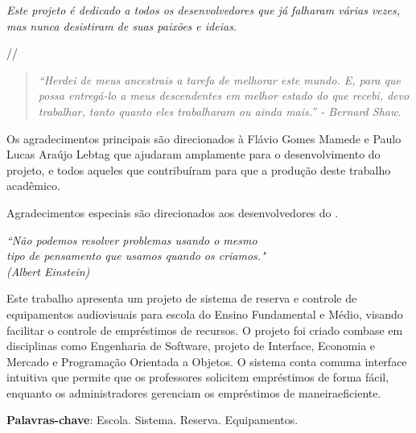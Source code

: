 \documentclass[
	12pt,				%
	openright,			%
	twoside,			%
	a4paper,			%
	english,			%
	french,				%
	spanish,			%
	brazil				%
	]{abntex2}
\begin{document}
\begin{dedicatoria}
   \vspace*{\fill}
   \centering
   \noindent
   \textit{Este projeto é dedicado a todos os desenvolvedores que já falharam várias vezes, mas nunca desistiram de suas paixões e ideias.}

   //

   \begin{quote}
	\textit{``Herdei de meus ancestrais a tarefa de melhorar este mundo. E, para que possa entregá-lo a meus descendentes em melhor estado do que recebi, devo trabalhar, tanto quanto eles trabalharam ou ainda mais.'' - Bernard Shaw.}
   \end{quote}

   \vspace*{\fill}

\end{dedicatoria}

\begin{agradecimentos}
Os agradecimentos principais são direcionados à Flávio Gomes Mamede e Paulo Lucas Araújo Lebtag que ajudaram amplamente para o desenvolvimento do projeto, e todos aqueles que contribuíram para que a produção deste trabalho acadêmico.

Agradecimentos especiais são direcionados aos desenvolvedores do \abnTeX.

\end{agradecimentos}

\begin{epigrafe}
	\vspace*{\fill}
	\begin{flushright}
		\textit{``Não podemos resolver problemas usando o mesmo \\
		tipo de pensamento que usamos quando os criamos." \\
		(Albert Einstein)}
	\end{flushright}
\end{epigrafe}


\setlength{\absparsep}{18pt} %
\begin{resumo}
 Este trabalho apresenta um projeto de sistema de reserva e controle de
equipamentos audiovisuais para escola do Ensino Fundamental e Médio, visando
facilitar o controle de empréstimos de recursos. O projeto foi criado combase em
disciplinas como Engenharia de Software, projeto de Interface, Economia e
Mercado e Programação Orientada a Objetos. O sistema conta comuma interface
intuitiva que permite que os professores solicitem empréstimos de forma fácil,
enquanto os administradores gerenciam os empréstimos de maneiraeficiente.

 \textbf{Palavras-chave}:  Escola. Sistema. Reserva. Equipamentos.
\end{resumo}
\end{document}
